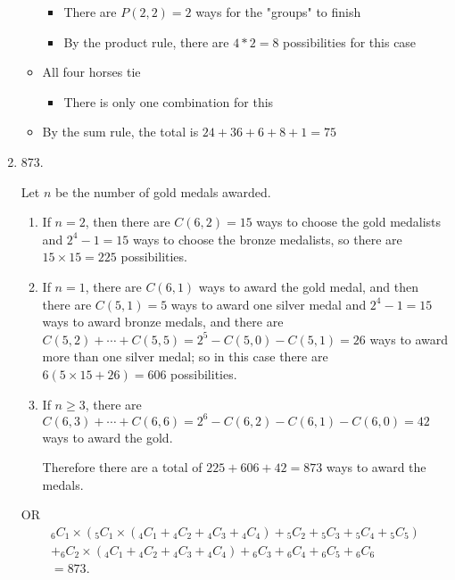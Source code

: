\documentclass{../../cls/sig-alternate-05-2015}
\begin{document}
\begin{enumerate}
\begin{itemize}
\begin{itemize}
				\item There are $P(2,2) = 2$ ways for the "groups" to finish
				
				\item  By the product rule, there are $4*2 = 8$ possibilities for this case
			\end{itemize}		
		\item All four horses tie
			\begin{itemize}
				\item There is only one combination for this
			\end{itemize}		
		\item By the sum rule, the total is $ 24+36+6+8+1 = 75$
	\end{itemize}
	
	\item 873.
	
	Let $n$ be the number of gold medals awarded.
	\begin{enumerate}
		\item If $n=2$, then there are $C(6,2)=15$ ways to choose the gold medalists and $2^4-1=15$ ways to choose the bronze medalists, so there are $15\times 15=225$ possibilities.
		
		\item If $n=1$, there are $C(6,1)$ ways to award the gold medal, and then there are $C(5,1)=5$ ways to award one silver medal and $2^4-1=15$ ways to award bronze medals, and there are $C(5,2)+ \cdots + C(5,5)=2^5-C(5,0)-C(5,1)=26$ ways to award more than one silver medal; so in this case there are $6(5\times 15 + 26)=606$ possibilities.
		
		\item If $n\geq3$, there are $C(6,3)+\cdots +C(6,6)=2^6-C(6,2)-C(6,1)-C(6,0)=42$ ways to award the gold.
		
		Therefore there are a total of $225+606+42=873$ ways to award the medals.
	\end{enumerate}

OR
 \begin{multline}
		{}_6 C_1 \times ({}_5 C_1 \times ({}_4 C_1 + {}_4 C_2 + {}_4 C_3 + {}_4 C_4) + {}_5 C_2 + {}_5 C_3 + {}_5 C_4 + {}_5 C_5)\\
		+ {}_6 C_2 \times ({}_4 C_1 + {}_4 C_2 + {}_4 C_3 + {}_4 C_4) + {}_6 C_3 + {}_6 C_4 + {}_6 C_5 + {}_6 C_6\\
		= 873.
	\end{multline}
\end{enumerate}
\end{document}
